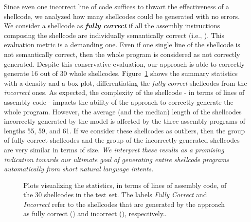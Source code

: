 Since even one incorrect line of code suffices to thwart the effectiveness of a shellcode, we analyzed how many shellcodes could be generated with no errors. We consider a shellcode as \textit{\textbf{fully correct}} if all the assembly instructions composing the shellcode are individually semantically correct (i.e., ).
This evaluation metric is a demanding one. Even if one single line of the shellcode is not semantically correct, then the whole program is considered as not correctly generated. Despite this conservative evaluation, our approach is able to correctly generate 16 out of 30 whole shellcodes. 
Figure~\ref{fig:shellcode_length} shows the summary statistics with a density and a box plot, differentiating the \textit{fully correct} shellcodes  from the \textit{incorrect} ones. As expected, the complexity of the shellcode - in terms of lines of assembly code - impacts the ability of the approach to correctly generate the whole program. 
However, the average (and the median) length of the shellcodes incorrectly generated by the model is affected by the three assembly programs of lengths 55, 59, and 61. If we consider these shellcodes as outliers, then the group of fully correct shellcodes and the group of the incorrectly generated shellcodes are very similar in terms of size.
\textit{We interpret these results as a promising indication towards our ultimate goal of generating entire shellcode programs automatically from short natural language intents.}



 \begin{figure}[ht]

    \centering
    
    \hfill
    \caption{Plots visualizing the statistics, in terms of lines of assembly code, of the  30 shellcodes in the test set. The labels \textit{Fully Correct} and \textit{Incorrect} refer to the shellcodes that are generated by the approach as fully correct () and incorrect (), respectively..}
    \label{fig:shellcode_length}
     
\end{figure}

